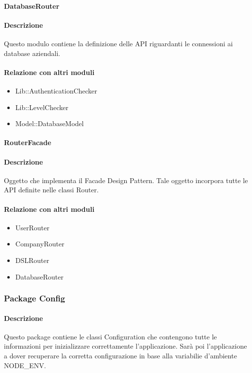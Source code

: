 \paragraph{DatabaseRouter}
\paragraph*{Descrizione}
Questo modulo contiene la definizione delle API riguardanti le connessioni ai database aziendali.

\paragraph*{Relazione con altri moduli}
\begin{itemize}
\item Lib::AuthenticationChecker
\item Lib::LevelChecker
\item Model::DatabaseModel
\end{itemize}

\paragraph{RouterFacade}
\paragraph*{Descrizione}
Oggetto che implementa il Facade Design Pattern. Tale oggetto incorpora tutte le API definite nelle classi Router.

\paragraph*{Relazione con altri moduli}
\begin{itemize}
\item UserRouter
\item CompanyRouter
\item DSLRouter
\item DatabaseRouter
\end{itemize}

\subsubsection{Package Config}
\paragraph*{Descrizione}
Questo package contiene le classi Configuration che contengono tutte le informazioni per inizializzare correttamente l'applicazione. 
Sarà poi l'applicazione a dover recuperare la corretta configurazione in base alla variabilie d'ambiente NODE\_ENV.

